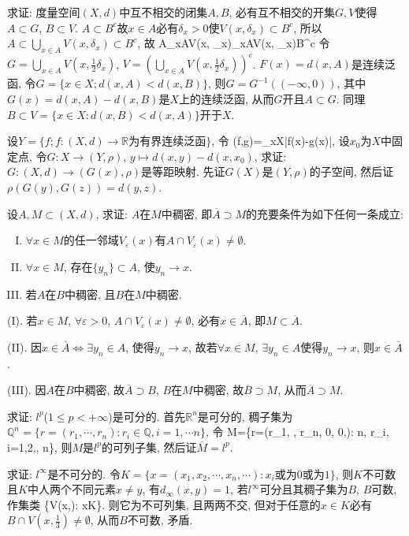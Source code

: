 \bq{}{}
求证: 度量空间$(X,d)$中互不相交的闭集$A,B$, 必有互不相交的开集$G, V$使得$A\subset G$, $B\subset V$.
\eq
\ba
$A\subset B^c$故$x\in A$必有$\delta_x>0$使$V(x, \delta_x)\subset B^c$, 所以$A\subset\bigcup_{x\in A}V(x, \delta_x)\subset B^c$, 故
\bee
A\subset\bigcup_{x\in A}V(x, \delta_x)\subset{}\subset\bigcup_{x\in A}V(x, \delta_x)\subset B^c
\eee
令$G=\bigcup_{x\in A}V(x,\frac12\delta_x)$, $V=\left(\bigcup_{x\in A}V(x,\frac12\delta_x)\right)^c$.
\ea
\ba
$F(x)=d(x, A)$是连续泛函, 令$G=\{x\in X; d(x, A)< d(x,B)\}$, 则$G=G^{-1}((-\infty,0))$, 其中$G(x)=d(x, A)-d(x, B)$是$X$上的连续泛函, 从而$G$开且$A\subset G$.
同理$B\subset V=\{x\in X: d(x, B)< d(x, A)\}$开于$X$.
\ea

\bq{}{}
设$Y=\{f; f:(X,d)\to\mathbb{R}\textrm{为有界连续泛函}\}$, 令
\bee
\rho(f,g)=\sup_{x\in X}|f(x)-g(x)|,
\eee
设$x_0$为$X$中固定点, 令$G: X\to(Y,\rho)$, $y\mapsto d(x,y)-d(x, x_0)$, 求证:
$G:(X,d)\to(G(x), \rho)$是等距映射.
\eq
\ba
先证$G(X)$是$(Y,\rho)$的子空间, 然后证$\rho(G(y), G(z))=d(y,z)$.
\ea

\bq{}{}
设$A, M\subset(X,d)$, 求证: $A$在$M$中稠密, 即$\overline{A}\supset M$的充要条件为如下任何一条成立:
\begin{enumerate}[(I)]
 \item $\forall x\in M$的任一邻域$V_{\varepsilon}(x)$有$A\cap V_{\varepsilon}(x)\ne\emptyset$.
 \item $\forall x\in M$, 存在$\{y_n\}\subset A$, 使$y_n\to x$.
 \item 若$A$在$B$中稠密, 且$B$在$M$中稠密.
\end{enumerate}
\eq
\ba
(I).  若$x\in M$, $\forall \varepsilon>0$, $A\cap V_{\varepsilon}(x)\ne \emptyset$, 必有$x\in\overline{A}$, 即$M\subset\overline{A}$.

(II). 因$x\in\overline{A}\Longleftrightarrow\exists y_n\in A$, 使得$y_n\to x$, 故若$\forall x\in M$, $\exists y_n\in A$使得$y_n\to x$, 则$x\in\overline{A}$.

(III). 因$A$在$B$中稠密, 故$\overline{A}\supset B$, $B$在$M$中稠密, 故$\overline{B}\supset M$, 从而$\overline{A}\supset M$.
\ea

\bq{}{}
求证: $l^p$($1\le p<+\infty$)是可分的.
\eq
\ba
首先$\mathbb{R}^n$是可分的, 稠子集为$\mathbb{Q}^n=\{r=(r_1,\cdots,r_n):r_i\in\mathbb{Q},i=1,\cdots n\}$, 
令
\bee
M=\{r=(r_1, \cdots, r_n, 0, 0,\cdots): n\in {}, r_i\in {}, i=1,2,\cdots, n\}, 
\eee
则$M$是$l^p$的可列子集,
然后证$\overline{M}=l^p$.
\ea

\bq{}{}
求证: $l^{\infty}$是不可分的.
\eq
\ba
令$K=\{x=(x_1, x_2,\cdots, x_n, \cdots): x_i\textrm{或为}0\textrm{或为}1\}$, 则$K$不可数且$K$中人两个不同元素$x\ne y$, 
有$d_{\infty}(x,y)=1$, 若$l^{\infty}$可分且其稠子集为$B$, $B$可数, 作集类
\bee
\left\{V\left(x,\right): x\in K\right\}.
\eee
则它为不可列集, 且两两不交, 但对于任意的$x\in K$必有$B\cap V\left(x,\frac13\right)\ne\emptyset$, 从而$B$不可数, 矛盾.
\ea

